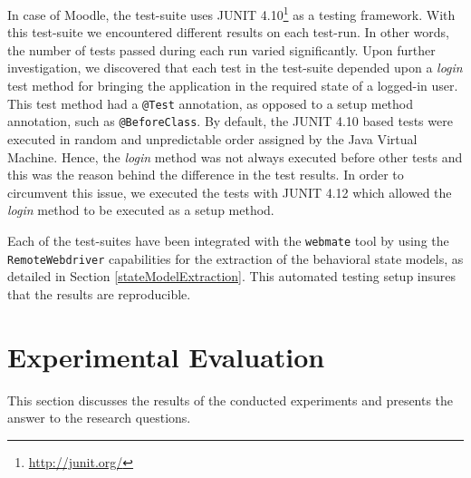In case of Moodle, the test-suite uses JUNIT 4.10\footnote{\url{http://junit.org/}} as a testing framework. With this test-suite we encountered different results on each test-run. In other words, the number of tests passed during each run varied significantly. Upon further investigation, we discovered that each test in the test-suite depended upon a \textit{login} test method for bringing the application in the required state of a logged-in user. This test method had a \texttt{@Test} annotation, as opposed to a setup method annotation, such as \texttt{@BeforeClass}. By default, the JUNIT 4.10 based tests were executed in random and unpredictable order assigned by the Java Virtual Machine. Hence, the \textit{login} method was not always executed before other tests and this was the reason behind the difference in the test results. In order to circumvent this issue, we executed the tests with JUNIT 4.12 which allowed the \textit{login} method to be executed as a setup method. 

Each of the test-suites have been integrated with the \texttt{webmate} tool by using the \texttt{RemoteWebdriver} capabilities for the extraction of the behavioral state models, as detailed in Section \ref{stateModelExtraction}. This automated testing setup insures that the results are reproducible. 
\begin{table}
\centering
{}
\caption{Overview of Selenium test-suites for candidate web applications}
\label{testcandidates}
\end{table}

\section{Experimental Evaluation}
\label{expeval}
This section discusses the results of the conducted experiments and presents the answer to the research questions. 

